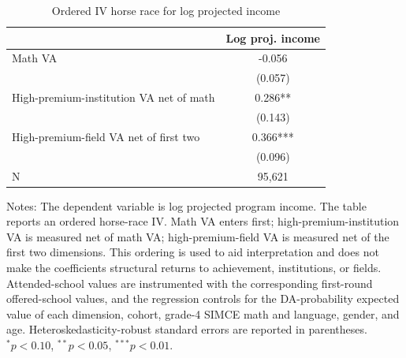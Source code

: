 \begin{table}[!htbp]
\centering
\caption{Ordered IV horse race for log projected income}
\label{tab:program-income-orthogonal-math-highinst-highpay}
\begin{tabular}{lc}
\toprule
 & Log proj. income \\
\midrule
Math VA & -0.056 \\
 & (0.057) \\
High-premium-institution VA net of math & 0.286** \\
 & (0.143) \\
High-premium-field VA net of first two & 0.366*** \\
 & (0.096) \\
\midrule
N & 95,621 \\
\bottomrule
\end{tabular}
\par\medskip
\footnotesize
\begin{minipage}{\textwidth}
Notes: The dependent variable is log projected program income. The table reports an ordered horse-race IV. Math VA enters first; high-premium-institution VA is measured net of math VA; high-premium-field VA is measured net of the first two dimensions. This ordering is used to aid interpretation and does not make the coefficients structural returns to achievement, institutions, or fields. Attended-school values are instrumented with the corresponding first-round offered-school values, and the regression controls for the DA-probability expected value of each dimension, cohort, grade-4 SIMCE math and language, gender, and age. Heteroskedasticity-robust standard errors are reported in parentheses. $^{*}p<0.10$, $^{**}p<0.05$, $^{***}p<0.01$.
\end{minipage}
\end{table}
